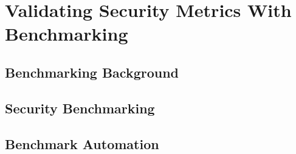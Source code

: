
\chapter{Validating Security Metrics With Benchmarking}\label{ch:benchmarking}



\section{Benchmarking Background}\label{sec:benchmark:pkb_background}




% 

\section{Security Benchmarking}\label{sec:benhmark:sec-pkb}



\section{Benchmark Automation}\label{sec:benchmark:secperfkit}




% 


